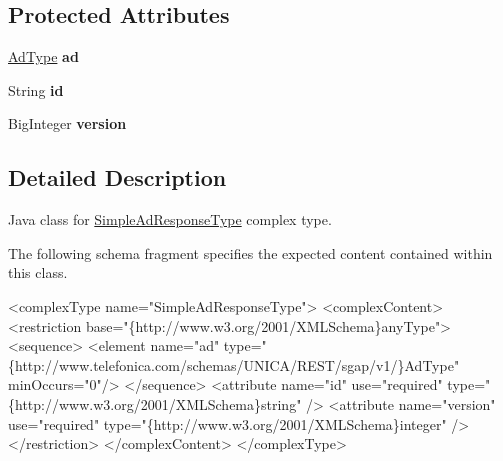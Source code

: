 \subsection*{Protected Attributes}
\begin{DoxyCompactItemize}
\item 
\hypertarget{classcom_1_1telefonica_1_1schemas_1_1unica_1_1rest_1_1sgap_1_1v1_1_1SimpleAdResponseType_a790152bd1240d96ac926ef7c2bf6316b}{
\hyperlink{classcom_1_1telefonica_1_1schemas_1_1unica_1_1rest_1_1sgap_1_1v1_1_1AdType}{AdType} {\bfseries ad}}
\label{classcom_1_1telefonica_1_1schemas_1_1unica_1_1rest_1_1sgap_1_1v1_1_1SimpleAdResponseType_a790152bd1240d96ac926ef7c2bf6316b}

\item 
\hypertarget{classcom_1_1telefonica_1_1schemas_1_1unica_1_1rest_1_1sgap_1_1v1_1_1SimpleAdResponseType_a882d133646eb8ab6df240d244ea7638e}{
String {\bfseries id}}
\label{classcom_1_1telefonica_1_1schemas_1_1unica_1_1rest_1_1sgap_1_1v1_1_1SimpleAdResponseType_a882d133646eb8ab6df240d244ea7638e}

\item 
\hypertarget{classcom_1_1telefonica_1_1schemas_1_1unica_1_1rest_1_1sgap_1_1v1_1_1SimpleAdResponseType_a50eb1924ce79ccdf15053e7c9da77d0c}{
BigInteger {\bfseries version}}
\label{classcom_1_1telefonica_1_1schemas_1_1unica_1_1rest_1_1sgap_1_1v1_1_1SimpleAdResponseType_a50eb1924ce79ccdf15053e7c9da77d0c}

\end{DoxyCompactItemize}


\subsection{Detailed Description}
Java class for \hyperlink{classcom_1_1telefonica_1_1schemas_1_1unica_1_1rest_1_1sgap_1_1v1_1_1SimpleAdResponseType}{SimpleAdResponseType} complex type.

The following schema fragment specifies the expected content contained within this class.


\begin{DoxyPre}
 <complexType name="SimpleAdResponseType">
   <complexContent>
     <restriction base="\{http://www.w3.org/2001/XMLSchema\}anyType">
       <sequence>
         <element name="ad" type="\{http://www.telefonica.com/schemas/UNICA/REST/sgap/v1/\}AdType" minOccurs="0"/>
       </sequence>
       <attribute name="id" use="required" type="\{http://www.w3.org/2001/XMLSchema\}string" />
       <attribute name="version" use="required" type="\{http://www.w3.org/2001/XMLSchema\}integer" />
     </restriction>
   </complexContent>
 </complexType>
 \end{DoxyPre}
 

